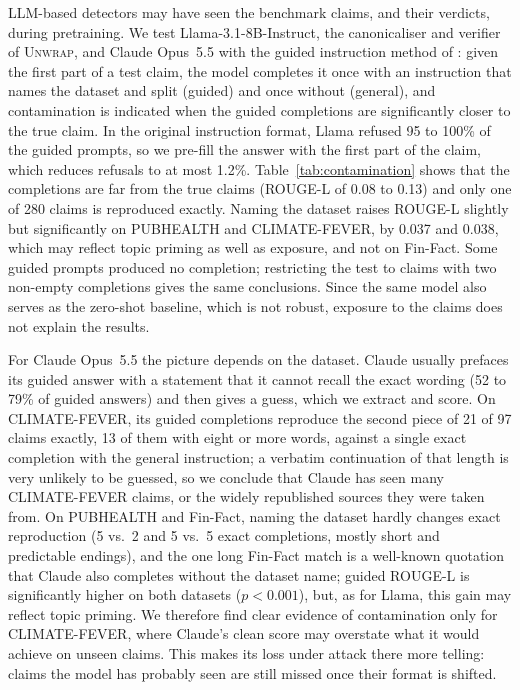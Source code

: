 \documentclass[11pt]{article}
\newcommand{\method}{\textsc{Unwrap}}
\begin{document}
LLM-based detectors may have seen the benchmark claims, and their verdicts, during pretraining. We test Llama-3.1-8B-Instruct, the canonicaliser and verifier of \method{}, and Claude Opus~5.5 with the guided instruction method of \citet{golchin2024timetravel}: given the first part of a test claim, the model completes it once with an instruction that names the dataset and split (guided) and once without (general), and contamination is indicated when the guided completions are significantly closer to the true claim. In the original instruction format, Llama refused 95 to 100\% of the guided prompts, so we pre-fill the answer with the first part of the claim, which reduces refusals to at most 1.2\%. Table~\ref{tab:contamination} shows that the completions are far from the true claims (ROUGE-L \citep{lin2004rouge} of 0.08 to 0.13) and only one of 280 claims is reproduced exactly. Naming the dataset raises ROUGE-L slightly but significantly on PUBHEALTH and CLIMATE-FEVER, by 0.037 and 0.038, which may reflect topic priming as well as exposure, and not on Fin-Fact. Some guided prompts produced no completion; restricting the test to claims with two non-empty completions gives the same conclusions. Since the same model also serves as the zero-shot baseline, which is not robust, exposure to the claims does not explain the results.

For Claude Opus~5.5 the picture depends on the dataset. Claude usually prefaces its guided answer with a statement that it cannot recall the exact wording (52 to 79\% of guided answers) and then gives a guess, which we extract and score. On CLIMATE-FEVER, its guided completions reproduce the second piece of 21 of 97 claims exactly, 13 of them with eight or more words, against a single exact completion with the general instruction; a verbatim continuation of that length is very unlikely to be guessed, so we conclude that Claude has seen many CLIMATE-FEVER claims, or the widely republished sources they were taken from. On PUBHEALTH and Fin-Fact, naming the dataset hardly changes exact reproduction (5 vs.\ 2 and 5 vs.\ 5 exact completions, mostly short and predictable endings), and the one long Fin-Fact match is a well-known quotation that Claude also completes without the dataset name; guided ROUGE-L is significantly higher on both datasets ($p<0.001$), but, as for Llama, this gain may reflect topic priming. We therefore find clear evidence of contamination only for CLIMATE-FEVER, where Claude's clean score may overstate what it would achieve on unseen claims. This makes its loss under attack there more telling: claims the model has probably seen are still missed once their format is shifted.
\end{document}
